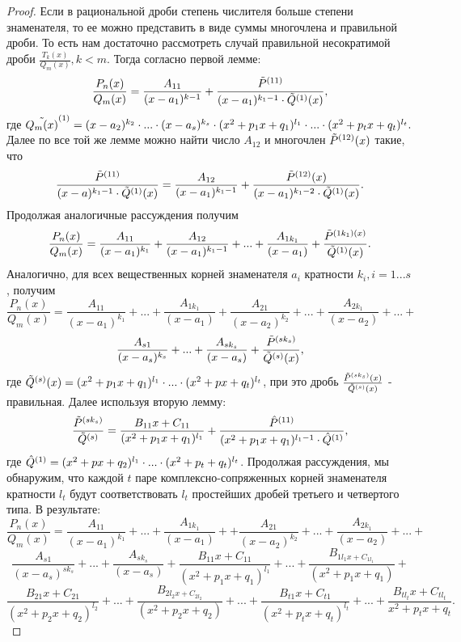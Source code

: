 \documentclass{article}
\newcommand*{\p}[1][n]{P_{#1}(x)}
\newcommand*{\Q}[1][m]{Q_{#1}(x)}
\newcommand*{\Rfrac}[2]{\frac{\p{#1}}{\Q{#2}}}
\begin{document}
\begin{proof}
    Если в рациональной дроби степень числителя больше степени знаменателя, то ее можно представить в виде суммы многочлена и правильной дроби. То есть нам достаточно рассмотреть случай правильной несократимой дроби $\frac{T_k(x)}{Q_m(x)}, k < m$. Тогда согласно первой лемме: 
    $$
        \Rfrac{}{} = \frac{A_{11}}{(x - a_1)^{k-1}} + \frac{\Tilde{P}^{(11)}}{(x - a_1)^{k_1 - 1} \cdot \Tilde{Q}^{(1)}(x)},
    $$ 
    где $\Tilde{\Q}^{(1)} = (x - a_2)^{k_2} \cdot ... \cdot (x - a_s)^{k_s} \cdot (x^2 + p_1x + q_1)^{l_1} \cdot ... \cdot (x^2 + p_tx + q_t)^{l_t}.$ Далее по все той же лемме можно найти число $A_{12}$ и многочлен $\Tilde{P}^{(12)}(x)$ такие, что 
    $$
        \frac{\Tilde{P}^{(11)}}{(x - a)^{k_1 - 1} \cdot \Tilde{Q}^{(1)}(x)} = \frac{A_{12}}{(x - a_1)^{k_1 - 1}} + \frac{\Tilde{P}^{(12)}(x)}{(x - a_1)^{k_1 - 2} \cdot \Tilde{Q}^{(1)}(x)}. 
    $$
    Продолжая аналогичные рассуждения получим 
    $$
        \Rfrac{}{} = \frac{A_{11}}{(x - a_1)^{k_1}} + \frac{A_{12}}{(x - a_1)^{k_1 - 1}} + ... + \frac{A_{1k_1}}{(x - a_1)} + \frac{\Tilde{P}^{(1k_1)(x)}}{\Tilde{Q}^{(1)}(x)}.
    $$
    Аналогично, для всех вещественных корней знаменателя $a_i$ кратности $k_i, i = 1...s$, получим
    $$
        \Rfrac{}{} = \frac{A_{11}}{(x - a_1)^{k_1}} + ... + \frac{A_{1k_1}}{(x - a_1)} + \frac{A_{21}}{(x - a_2)^{k_2}} + ... + \frac{A_{2k_1}}{(x - a_2)} + ... +
    $$
    $$
        \frac{A_{s1}}{(x - a_s)^{k_s}} + ... + \frac{A_{sk_s}}{(x - a_s)} + \frac{\Tilde{P}^{(sk_s)}}{\Tilde{Q}^{(s)}(x)},
    $$
    где $\Tilde{Q}^{(s)}(x) = (x^2 + p_1x + q_1)^{l_1} \cdot ... \cdot (x^2 + px + q_t)^{l_t}$, при это дробь $\frac{\Tilde{P}^{(sk_s)}(x)}{\Tilde{Q}^{(s)}(x)}$ - правильная. Далее используя вторую лемму:
    $$
        \frac{\Tilde{P}^{(sk_s)}}{\Tilde{Q}^{(s)}} = \frac{B_{11}x + C_{11}}{(x^2 + p_1x + q_1)^{l_1}} + \frac{\Hat{P}^{(11)}}{(x^2 + p_1x + q_1)^{l_1 - 1} \cdot \Hat{Q}^{(1)}},
    $$
    где $\Hat{Q}^{(1)} = (x^2 + px + q_2)^{l_1} \cdot ... \cdot (x^2 + p_t + q_t)^{l_t}$. Продолжая рассуждения, мы обнаружим, что каждой $t$ паре комплексно-сопряженных корней знаменателя кратности $l_t$ будут соответствовать $l_t$ простейших дробей третьего и четвертого типа. В результате:
    $$
        \Rfrac{}{} = \frac{A_{11}}{(x - a_1)^{k_1}} + ... + \frac{A_{1k_1}}{(x - a_1)} + + \frac{A_{21}}{(x - a_2)^{k_2}} + ... + \frac{A_{2k_1}}{(x - a_2)} + ... +
    $$
    $$
        \frac{A_{s1}}{(x - a_s)^{sk_s}} + ... + \frac{A_{sk_s}}{(x - a_s)} + \frac{B_{11}x + C_{11}}{(x^2 + p_1x + q_1)^{l_1}} + ... + \frac{B_{1l_1x + C_{1l_1}}}{(x^2 + p_1x + q_1)} + 
    $$
    $$  
        \frac{B_{21}x + C_{21}}{(x^2 + p_2x + q_2)^{l_2}} + ... + \frac{B_{2l_2x + C_{2l_2}}}{(x^2 + p_2x + q_2)} + ... + \frac{B_{t1}x + C_{t1}}{(x^2 + p_tx + q_t)^{l_t}} + ... + \frac{B_{tl_t}x + C_{tl_t}}{x^2 + p_tx + q_t}.
    $$
\end{proof}
\end{document}
